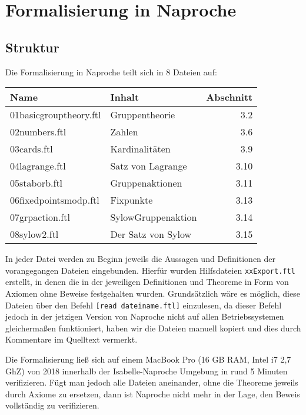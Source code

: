 \documentclass[a4paper,12pt]{scrartcl}
\begin{document}
\section{Formalisierung in Naproche}


\subsection{Struktur }
Die Formalisierung in Naproche teilt sich in 8 Dateien auf:

\medskip

\begin{tabularx}{\textwidth}{p{}|X|r}
	Name & Inhalt & Abschnitt\\
	\hline
	01basicgrouptheory.ftl 		& Gruppentheorie		& 3.2\\
	\hline
	02numbers.ftl		& Zahlen		& 3.6\\
	\hline
	03cards.ftl			& Kardinalitäten		& 3.9\\
	\hline
	04lagrange.ftl 		& Satz von Lagrange		& 3.10\\
	\hline
	05staborb.ftl		& Gruppenaktionen		& 3.11\\
	\hline
	06fixedpointsmodp.ftl		& Fixpunkte		& 3.13\\
	\hline
	07grpaction.ftl 	& SylowGruppenaktion		& 3.14\\
	\hline
	08sylow2.ftl & Der Satz von Sylow  & 3.15 \\

\end{tabularx}

\medskip

In jeder Datei werden zu Beginn jeweils die Aussagen und Definitionen der vorangegangen Dateien eingebunden. Hierfür wurden Hilfsdateien \verb!xxExport.ftl! erstellt, in denen die in der jeweiligen Definitionen und Theoreme in Form von Axiomen ohne Beweise festgehalten wurden.
Grundsätzlich wäre es möglich, diese Dateien über den Befehl \verb![read dateiname.ftl]! einzulesen, da dieser Befehl jedoch in der jetzigen Version von Naproche nicht auf allen Betriebssystemen gleichermaßen funktioniert, haben wir die Dateien manuell kopiert und dies durch Kommentare im Quelltext vermerkt.

Die Formalisierung ließ sich auf einem MacBook Pro (16 GB RAM, Intel i7 2,7 GhZ) von 2018 innerhalb der Isabelle-Naproche Umgebung\cite{bibtex.f} in rund 5 Minuten verifizieren. Fügt man jedoch alle Dateien aneinander, ohne die Theoreme jeweils durch Axiome zu ersetzen, dann ist Naproche nicht mehr in der Lage, den Beweis vollständig zu verifizieren.
\end{document}
